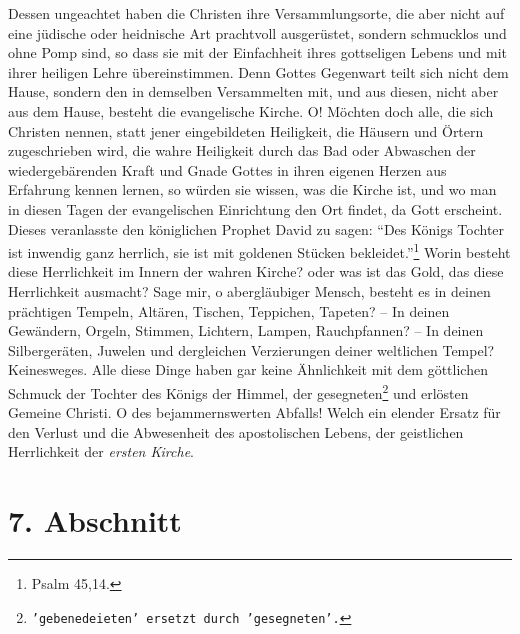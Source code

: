 \medskip

Dessen ungeachtet haben die Christen ihre Versammlungsorte, die aber nicht auf
eine jüdische oder heidnische Art prachtvoll ausgerüstet, sondern schmucklos und
ohne Pomp sind, so dass sie mit der Einfachheit ihres gottseligen Lebens und mit
ihrer heiligen Lehre übereinstimmen. Denn Gottes Gegenwart
teilt sich nicht dem
Hause, sondern den in demselben Versammelten mit, und aus diesen, nicht aber aus
dem Hause, besteht die evangelische Kirche. O! Möchten doch alle, die sich
Christen nennen, statt jener eingebildeten Heiligkeit, die Häusern und Örtern
zugeschrieben wird, die wahre Heiligkeit durch das Bad oder Abwaschen der
wiedergebärenden Kraft und Gnade Gottes in ihren eigenen Herzen aus Erfahrung
kennen lernen, so würden sie wissen, was die Kirche ist, und wo man in diesen
Tagen der evangelischen Einrichtung den Ort findet, da Gott erscheint. Dieses
veranlasste den königlichen Prophet David zu sagen:
"`Des Königs Tochter ist inwendig ganz herrlich, sie ist mit goldenen Stücken
bekleidet."'\footnote{Psalm 45,14.}
Worin besteht diese Herrlichkeit im Innern der wahren Kirche?
oder was
ist das Gold, das diese Herrlichkeit ausmacht? Sage mir, o abergläubiger Mensch,
besteht es in deinen prächtigen Tempeln, Altären, Tischen,
Teppichen, Tapeten?
-- In deinen Gewändern, Orgeln, Stimmen, Lichtern, Lampen,
Rauchpfannen? -- In
deinen Silbergeräten, Juwelen und dergleichen Verzierungen deiner weltlichen
Tempel? Keinesweges. Alle diese Dinge haben gar keine
Ähnlichkeit mit dem
göttlichen Schmuck der Tochter des Königs der Himmel, der
gesegneten\footnote{\texttt{'gebenedeieten' ersetzt durch 'gesegneten'.}}
und
erlösten Gemeine Christi. O des bejammernswerten Abfalls! Welch ein elender
Ersatz für den Verlust und die Abwesenheit des apostolischen Lebens, der
geistlichen Herrlichkeit der \textit{ersten Kirche}.

\section{7. Abschnitt} \label{kap5_ab7}

